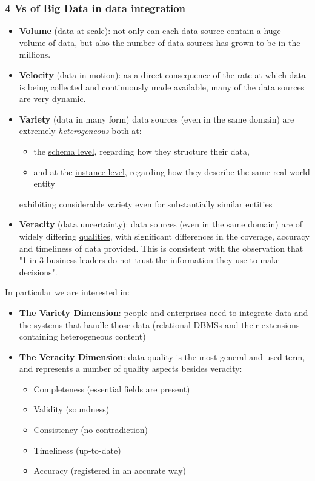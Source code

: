 \documentclass[10pt,a4paper]{article}
\begin{document}
\subsubsection{4 Vs of Big Data in data integration}
\begin{itemize}
	\item \textbf{Volume} (data at scale): not only can each data source contain a \uline{huge volume of data}, but also the number of data sources has grown to be in the millions.
	\item \textbf{Velocity} (data in motion): as a direct consequence of the \uline{rate} at which data is being collected and continuously made available, many of the data sources are very dynamic.
	\item \textbf{Variety} (data in many form) data sources (even in the same domain) are extremely \textit{heterogeneous} both at:
	\begin{itemize}
		\item the \uline{schema level}, regarding how they structure their data, 
		\item and at the \uline{instance level}, regarding how they describe the same real world entity
\end{itemize}
exhibiting considerable variety even for substantially similar entities
	\item \textbf{Veracity} (data uncertainty): data sources (even in the same domain) are of widely differing \uline{qualities}, with significant differences in the coverage, accuracy and timeliness of data provided. This is consistent with the observation that "1 in 3 business leaders do not trust the information they use to make decisions".
\end{itemize}
In particular we are interested in:
\begin{itemize}
	\item \textbf{The Variety Dimension}: people and enterprises need to integrate data and the systems that handle those data (relational DBMSs and their extensions containing heterogeneous content)
	\item \textbf{The Veracity Dimension}: data quality is the most general and used term, and represents a number of quality aspects besides veracity:
	\begin{itemize}
		\item Completeness (essential fields are present)
		\item Validity (soundness)
		\item Consistency (no contradiction)
		\item Timeliness (up-to-date)
		\item Accuracy (registered in an accurate way)
	\end{itemize}
\end{itemize}
\end{document}
